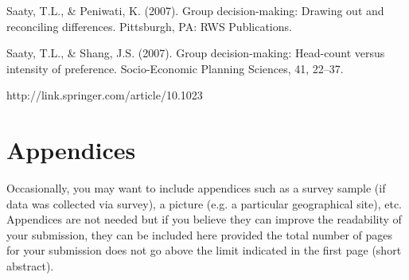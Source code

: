 \documentclass[11pt]{article}
\begin{document}
Saaty, T.L., \& Peniwati, K. (2007). Group decision-making: Drawing out and reconciling differences. Pittsburgh, PA: RWS Publications.

Saaty, T.L., \& Shang, J.S. (2007). Group decision-making: Head-count versus intensity of preference. Socio-Economic Planning Sciences, 41, 22–37.

http://link.springer.com/article/10.1023%

\section{Appendices}
Occasionally, you may want to include appendices such as a survey sample (if data was collected via survey), a picture (e.g. a particular geographical site), etc. Appendices are not needed but if you believe they can improve the readability of your submission, they can be included here provided the total number of pages for your submission does not go above the limit indicated in the first page (short abstract).
\end{document}
